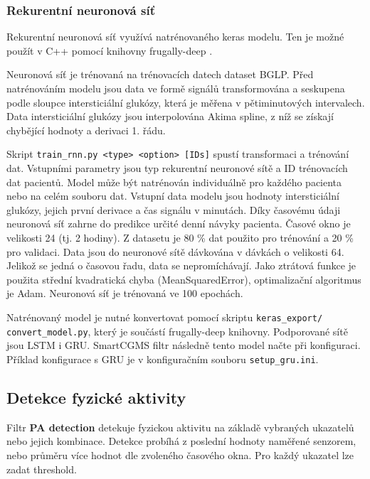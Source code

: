 \subsubsection{Rekurentní neuronová síť}

Rekurentní neuronová síť využívá natrénovaného keras modelu. Ten je možné použít v C++ pomocí knihovny frugally-deep \citep{cho.frugally}.

Neuronová síť je trénovaná na trénovacích datech dataset BGLP. Před natrénováním modelu jsou data ve formě signálů transformována a seskupena podle sloupce intersticiální glukózy, která je měřena v pětiminutových intervalech. Data intersticiální glukózy jsou interpolována Akima spline, z níž se získají chybějící hodnoty a derivaci 1. řádu.

Skript \texttt{train\_rnn.py <type> <option> [IDs]} spustí transformaci a trénování dat. Vstupními parametry jsou typ rekurentní neuronové sítě a ID trénovacích dat pacientů. Model může být natrénován individuálně pro každého pacienta nebo na celém souboru dat. Vstupní data modelu jsou hodnoty intersticiální glukózy, jejich první derivace a čas signálu v minutách. Díky časovému údaji neuronová síť zahrne do predikce určité denní návyky pacienta. Časové okno je velikosti 24 (tj. 2 hodiny). Z datasetu je 80 \% dat použito pro trénování a 20 \% pro validaci. Data jsou do neuronové sítě dávkována v dávkách o velikosti 64. Jelikož se jedná o časovou řadu, data se nepromíchávají. Jako ztrátová funkce je použita střední kvadratická chyba (MeanSquaredError), optimalizační algoritmus je Adam. Neuronová síť je trénovaná ve 100 epochách. 

Natrénovaný model je nutné konvertovat pomocí skriptu \texttt{keras\_export/ convert\_model.py}, který je součástí frugally-deep knihovny. Podporované sítě jsou LSTM i GRU. SmartCGMS filtr následně tento model načte při konfiguraci. Příklad konfigurace s GRU je v konfiguračním souboru \texttt{setup\_gru.ini}.



\subsection{Detekce fyzické aktivity}

Filtr \textbf{PA detection} detekuje fyzickou aktivitu na základě vybraných ukazatelů nebo jejich kombinace. Detekce probíhá z poslední hodnoty naměřené senzorem, nebo průměru více hodnot dle zvoleného časového okna. Pro každý ukazatel lze zadat threshold.

